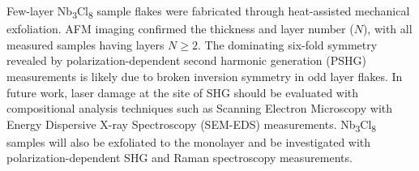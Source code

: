     {
    Few-layer Nb\textsubscript{3}Cl\textsubscript{8} sample flakes were fabricated through heat-assisted mechanical exfoliation. AFM imaging confirmed the thickness and layer number ($N$), with all measured samples having layers $N \geq 2$. The dominating six-fold symmetry revealed by polarization-dependent second harmonic generation (PSHG) measurements is likely due to broken inversion symmetry in odd layer flakes. In future work, laser damage at the site of SHG should be evaluated with compositional analysis techniques such as Scanning Electron Microscopy with Energy Dispersive X-ray Spectroscopy (SEM-EDS) measurements. Nb\textsubscript{3}Cl\textsubscript{8} samples will also be exfoliated to the monolayer and be investigated with polarization-dependent SHG and Raman spectroscopy measurements.
    }

    \newpage
    